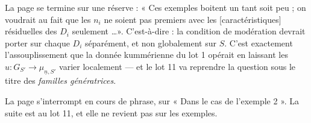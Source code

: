 \documentclass[11pt,a4paper]{article}
\begin{document}
La page se termine sur une réserve : « Ces exemples boitent un tant soit peu ;
on voudrait au fait que les $n_{i}$ ne soient pas premiers avec les
[caractéristiques] résiduelles des $D_{i}$ seulement \dots ». C'est-à-dire :
la condition de modération devrait porter sur chaque $D_{i}$ séparément, et non
globalement sur $S$. C'est exactement l'assouplissement que la donnée
kummérienne du lot 1 opérait en laissant les $u : G_{S'} \to
\mu_{\underline{n},S'}$ varier localement --- et le lot 11 va reprendre la
question sous le titre des \emph{familles génératrices}.

La page s'interrompt en cours de phrase, sur « Dans le cas de l'exemple 2 ». La
suite est au lot 11, et elle ne revient pas sur les exemples.
\end{document}
